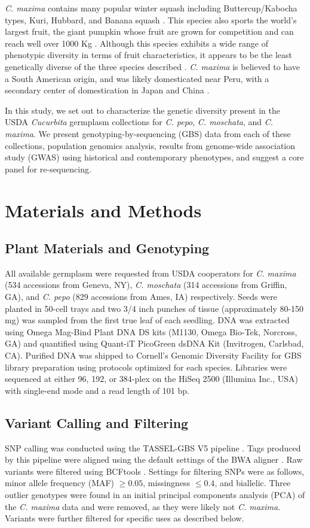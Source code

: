 \documentclass[utf8]{FrontiersinHarvard} %
\begin{document}
\emph{C. maxima} contains many popular winter squash including Buttercup/Kabocha types, Kuri, Hubbard, and Banana squash \citep{Ferriol}.
This species also sports the world's largest fruit, the giant pumpkin whose fruit are grown for competition and can reach well over 1000 Kg \citep{Savage015}.
Although this species exhibits a wide range of phenotypic diversity in terms of fruit characteristics, it appears to be the least genetically diverse of the three species described \citep{Kates2017}.
\emph{C. maxima} is believed to have a South American origin, and was likely domesticated near Peru, with a secondary center of domestication in Japan and China \citep{Nee1990,Sun2017}.

In this study, we set out to characterize the genetic diversity present in the USDA \emph{Cucurbita} germplasm collections for \emph{C. pepo}, \emph{C. moschata}, and \emph{C. maxima}.
We present genotyping-by-sequencing (GBS) data from each of these collections, population genomics analysis, results from genome-wide association study (GWAS) using historical and contemporary phenotypes, and suggest a core panel for re-sequencing.


\section{Materials and Methods}

\subsection{Plant Materials and Genotyping}
All available germplasm were requested from USDA cooperators for \textit{C. maxima} (534 accessions from Geneva, NY), \textit{C. moschata} (314 accessions from Griffin, GA), and \textit{C. pepo} (829 accessions from Ames, IA) respectively. Seeds were planted in 50-cell trays and two 3/4 inch punches of tissue (approximately 80-150 mg) was sampled from the first true leaf of each seedling. DNA was extracted using Omega Mag-Bind Plant DNA DS kits (M1130, Omega Bio-Tek, Norcross, GA) and quantified using Quant-iT PicoGreen dsDNA Kit (Invitrogen, Carlsbad, CA). Purified DNA was shipped to Cornell’s Genomic Diversity Facility for GBS library preparation using protocols optimized for each species. Libraries were sequenced at either 96, 192, or 384-plex on the HiSeq 2500 (Illumina Inc., USA) with single-end mode and a read length of 101 bp.

\subsection{Variant Calling and Filtering}
SNP calling was conducted using the TASSEL-GBS V5 pipeline \citep{Glaubitz2014}. Tags produced by this pipeline were aligned using the default settings of the BWA aligner \citep{Li2009}. Raw variants were filtered using BCFtools \citep{Danecek2021}. Settings for filtering SNPs were as follows, minor allele frequency (MAF) $\geq 0.05$, missingness $\leq 0.4$, and biallelic. Three outlier genotypes were found in an initial principal components analysis (PCA) of the \textit{C. maxima} data and were removed, as they were likely not \textit{C. maxima}. Variants were further filtered for specific uses as described below.
\end{document}

